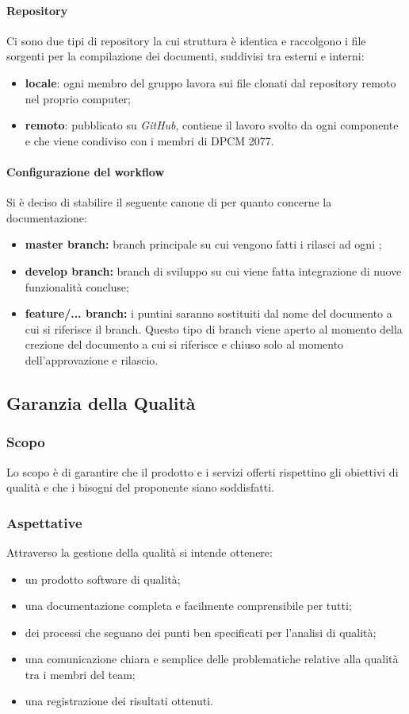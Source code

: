 			\paragraph{Repository}
			Ci sono due tipi di repository la cui struttura è identica e raccolgono i file sorgenti per la compilazione dei documenti, suddivisi tra esterni e interni:
			\begin{itemize}
		   			\item \textbf{locale}: ogni membro del gruppo lavora sui file clonati dal repository remoto nel proprio computer;
		   			\item \textbf{remoto}: pubblicato su \textit{GitHub}, contiene il lavoro svolto da ogni componente e che viene condiviso con i membri di DPCM 2077.
		   	\end{itemize}
		   	\paragraph{Configurazione del workflow}
	Si è deciso di stabilire il seguente canone di  per quanto concerne la documentazione:
	\begin{itemize}
	\item \textbf{master branch:} branch principale su cui vengono fatti i rilasci ad ogni ;
	\item \textbf{develop branch:} branch di sviluppo su cui viene fatta integrazione di nuove funzionalità concluse;
	\item \textbf{feature/... branch:} i puntini saranno sostituiti dal nome del documento a cui si riferisce il branch. Questo tipo di branch viene aperto al momento della crezione del documento a cui si riferisce e chiuso solo al momento dell'approvazione e rilascio.
	\end{itemize}
		   	
	\subsection{Garanzia della Qualità}
		\subsubsection{Scopo}
		Lo scopo è di garantire che il prodotto e i servizi offerti rispettino gli obiettivi di qualità e che i bisogni del proponente siano soddisfatti.
		\subsubsection{Aspettative}
		Attraverso la gestione della qualità si intende ottenere:
		\begin{itemize}
			\item un prodotto software di qualità;
			\item una documentazione completa e facilmente comprensibile per tutti;
			\item dei processi che seguano dei punti ben specificati per l'analisi di qualità;
			\item una comunicazione chiara e semplice delle problematiche relative alla qualità tra i membri del team;
			\item una registrazione dei risultati ottenuti.
		\end{itemize}

